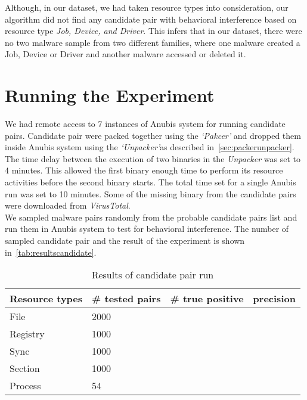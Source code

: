Although, in our dataset, we had taken resource types {\getresourcetypes{}} into consideration, our algorithm did not find any candidate pair with behavioral interference based on resource type \emph{Job, Device, and Driver}.
This infers that in our dataset, there were no two malware sample from two different families, where one malware created a Job, Device or Driver and another malware accessed or deleted it.
\section{Running the Experiment}
\label{sec:Running the Experiment}
We had remote access to 7 instances of Anubis system for running candidate pairs.
Candidate pair were packed together using the \emph{`Pakcer'} and dropped them inside Anubis system using the \emph{`Unpacker'}as described in~\ref{sec:packerunpacker}.
The time delay between the execution of two binaries in the \emph{Unpacker} was set to 4 minutes.
This allowed the first binary enough time to perform its resource activities before the second binary starts.
The total time set for a single Anubis run was set to 10 minutes.
Some of the missing binary from the candidate pairs were downloaded from \emph{VirusTotal}.\\

We sampled malware pairs randomly from the probable candidate pairs list and run them in Anubis system to test for behavioral interference.
The number of sampled candidate pair and the result of the experiment is shown in~\autoref{tab:resultscandidate}.
\begin{table}[ht]
  \caption[Results of candidate pair run]{Results of candidate pair run}\label{tab:resultscandidate}
  \centering
  \begin{tabular}{l l l l}
    \toprule
    Resource types & \# tested pairs & \# true positive & precision\\
    \midrule
    File & 2000\\
    Registry & 1000\\
    Sync & 1000\\
    Section & 1000\\
    Process & 54\\
    \bottomrule
  \end{tabular}
\end{table}
